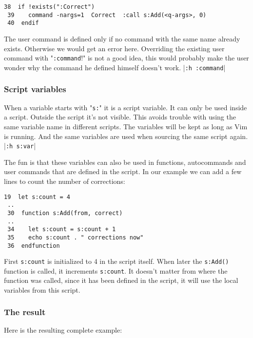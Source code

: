 \begin{Verbatim}[samepage=true]
 38  if !exists(":Correct")
 39    command -nargs=1  Correct  :call s:Add(<q-args>, 0)
 40  endif
\end{Verbatim}

The user command is defined only if no command with the same name already exists.
Otherwise we would get an error here.
Overriding the existing user command with "\verb!:command!!" is not a good idea, this would probably make the user wonder why the command he defined himself doesn't work.
|\verb!:h :command!|

\subsubsection{Script variables}
When a variable starts with "\verb!s:!" it is a script variable.
It can only be used inside a script.
Outside the script it's not visible.
This avoids trouble with using the same variable name in different scripts.
The variables will be kept as long as Vim is running.
And the same variables are used when sourcing the same script again. |\verb!:h s:var!|

The fun is that these variables can also be used in functions, autocommands and user commands that are defined in the script.
In our example we can add a few lines to count the number of corrections:

\begin{Verbatim}[samepage=true]
 19  let s:count = 4
 ..
 30  function s:Add(from, correct)
 ..
 34    let s:count = s:count + 1
 35    echo s:count . " corrections now"
 36  endfunction
\end{Verbatim}

First \verb!s:count! is initialized to 4 in the script itself.
When later the \verb!s:Add()! function is called, it increments \verb!s:count!.
It doesn't matter from where the function was called, since it has been defined in the script, it will use the local variables from this script.

\subsubsection{The result}
Here is the resulting complete example:

